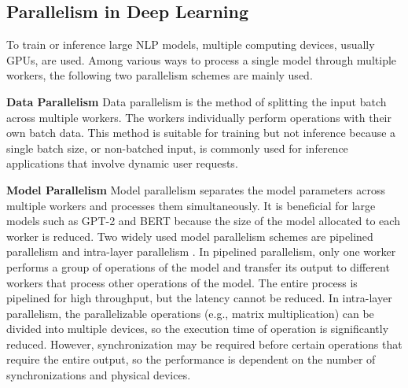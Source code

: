 \subsection{Parallelism in Deep Learning} \label{background_parallelism}

To train or inference large NLP models, multiple computing devices, usually GPUs, are used\cite{shazeer2018mesh, huang2019gpipe}. Among various ways to process a single model through multiple workers, the following two parallelism schemes are mainly used.

\textbf{Data Parallelism}
Data parallelism\cite{cormen1996bridging} is the method of splitting the input batch across multiple workers. The workers individually perform operations with their own batch data. This method is suitable for training but not inference because a single batch size, or non-batched input, is commonly used for inference applications that involve dynamic user requests. 

\textbf{Model Parallelism}
Model parallelism separates the model parameters across multiple workers and processes them simultaneously. It is beneficial for large models such as GPT-2\cite{radford2019language} and BERT\cite{devlin2018bert} because the size of the model allocated to each worker is reduced. 
Two widely used model parallelism schemes are pipelined parallelism \cite{tarnawski2020efficient} and intra-layer parallelism \cite{shoeybi2019megatron}. In pipelined parallelism, only one worker performs a group of operations of the model and transfer its output to different workers that process other operations of the model. The entire process is pipelined for high throughput, but the latency cannot be reduced. In intra-layer parallelism, the parallelizable operations (e.g., matrix multiplication) can be divided into multiple devices, so the execution time of operation is significantly reduced. However, synchronization may be required before certain operations that require the entire output, so the performance is dependent on the number of synchronizations and physical devices.


